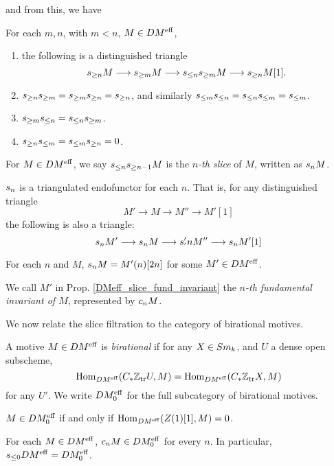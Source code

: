 and from this, we have

\begin{prop}
For each $m, n$, with $m < n$, $M \in DM^{\mathrm{eff}}$,

\begin{enumerate}
\item the following is a distinguished triangle
\begin{equation}
s_{\geq n}M \longrightarrow s_{\geq m}M \longrightarrow s_{\leq n}s_{\geq m}M \longrightarrow s_{\geq n}M[1].
\end{equation}

\item $s_{\geq n}s_{\geq m} = s_{\geq m}s_{\geq n} = s_{\geq n}$, and 
similarly $s_{\leq m}s_{\leq n} = s_{\leq n}s_{\leq m} = s_{\leq m}$.

\item $s_{\geq m}s_{\leq n} = s_{\leq n}s_{\geq m}$.

\item $s_{\geq n}s_{\leq m} = s_{\leq m}s_{\geq n} = 0$.
\end{enumerate}
\end{prop}

\begin{definition}
For $M \in DM^{\mathrm{eff}}$, we say $s_{\leq n}s_{\geq n - 1}M$ is the 
\emph{$n$-th slice} of $M$, written as $s_{n}M$.
\end{definition}

\begin{prop}
$s_{n}$ is a triangulated endofunctor for each $n$. That is,
for any distinguished triangle
\[
M' \to M \to M'' \to M'[1]
\]
the following is also a triangle:
\[
s_{n}M' \longrightarrow s_{n}M \longrightarrow s_{'}'{n}M'' \longrightarrow s_{n}M'[1]
\]
\end{prop}

\begin{prop}\label{DMeff_slice_fund_invariant}
For each $n$ and $M$, $s_{n}M = M'(n)[2n]$ for some $M' \in
DM^{\mathrm{eff}}$.
\end{prop}

\begin{definition}
We call $M'$ in Prop. \ref{DMeff_slice_fund_invariant} the 
\emph{$n$-th fundamental invariant of $M$}, represented by
$c_{n}M$.
\end{definition}

We now relate the slice filtration to the category of birational
motives.

\begin{definition}
A motive $M \in DM^{\mathrm{eff}}$ is \emph{birational} if for any $X \in 
Sm_k$, and $U$ a dense open subscheme,
\[
\mathrm{Hom}_{DM^{\mathrm{eff}}}(C_*\mathbb{Z}_{\mathrm{tr}}{U}, M) = \mathrm{Hom}_{DM^{\mathrm{eff}}}(C_*\mathbb{Z}_{\mathrm{tr}}{X}, M)
\]
for any $U'$. We write $DM^{\mathrm{eff}}_0$ for the full subcategory of
birational motives.
\end{definition}

\begin{prop}
$M \in DM^{\mathrm{eff}}_0$ if and only if $\mathrm{Hom}_{DM^{\mathrm{eff}}}(Z(1)[1], M) = 0$.
\end{prop}

\begin{prop}
For each $M \in DM^{\mathrm{eff}}$, $c_{n}M \in DM^{\mathrm{eff}}_0$ for every $n$.
In particular, $s_{\leq 0}DM^{\mathrm{eff}} = DM^{\mathrm{eff}}_0$.
\end{prop}

